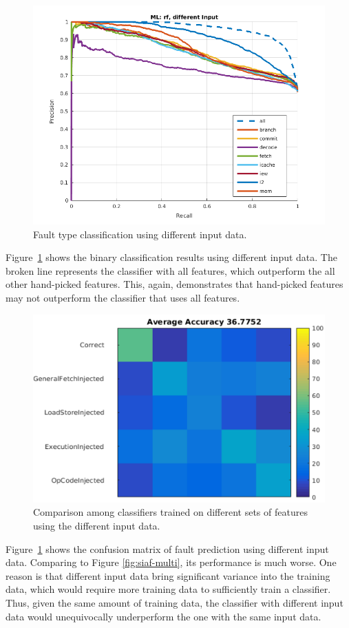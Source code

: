 \begin{figure}[t]
\begin{center}
   \includegraphics[width=0.8\linewidth]{./figures/didf.png}
\end{center}
   \caption{Fault type classification using different input data.}
\label{fig:didf}
\end{figure}

Figure~\ref{fig:didf} shows the binary classification results using different input data. The broken line represents the classifier with all features, which outperform the all other hand-picked features. This, again, demonstrates that hand-picked features may not outperform the classifier that uses all features.

\begin{figure}[t]
\begin{center}
   \includegraphics[width=0.8\linewidth]{./figures/diaf_multi.png}
\end{center}
   \caption{Comparison among classifiers trained on different sets of features using the different input data.}
\label{fig:diaf-multi}
\end{figure}

Figure~\ref{fig:didf} shows the confusion matrix of fault prediction using different input data. Comparing to Figure \ref{fig:siaf-multi}, its performance is much worse. One reason is that different input data bring significant variance into the training data, which would require more training data to sufficiently train a classifier. Thus, given the same amount of training data, the classifier with different input data would unequivocally underperform the one with the same input data.

